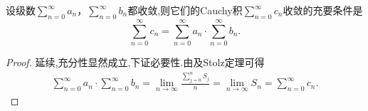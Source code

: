 \documentclass[../../main.tex]{subfiles}%
\begin{document}
\begin{corollary}\label{corollary:收敛级数Cauchy积收敛则就等于级数积}
设级数\(\sum_{n = 0}^{\infty} a_n\)，\(\sum_{n = 0}^{\infty} b_n\)都收敛,则它们的Cauchy积\(\sum_{n = 0}^{\infty} c_n\)收敛的充要条件是
\[
\sum_{n = 0}^{\infty} c_n = \sum_{n = 0}^{\infty} a_n \cdot \sum_{n = 0}^{\infty} b_n. 
\]
\end{corollary}
\begin{proof}

延续,充分性显然成立,下证必要性.由及Stolz定理可得
\begin{align*}
\sum_{n=0}^{\infty}{a_n}\cdot \sum_{n=0}^{\infty}{b_n}=\lim_{n\rightarrow \infty} \frac{\sum\limits_{j=0}^n{S_j}}{n}=\lim_{n\rightarrow \infty} S_n=\sum_{n=0}^{\infty}{c_n}.
\end{align*}

\end{proof}
\end{document}
